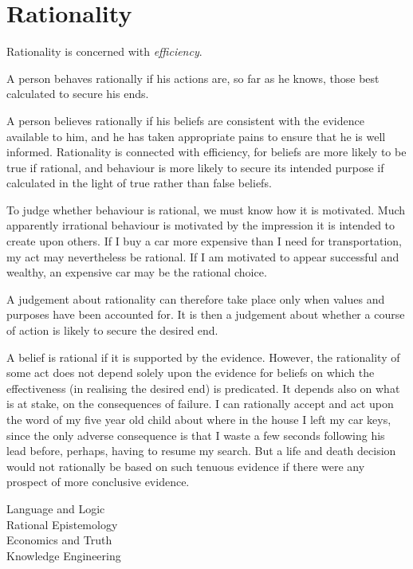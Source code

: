 \section{Rationality}

Rationality is concerned with {\it efficiency}.

A person behaves rationally if his actions are, so far as he knows, those best calculated to secure his ends.

A person believes rationally if his beliefs are consistent with the evidence available to him, and he has taken appropriate pains to ensure that he is well informed.
Rationality is connected with efficiency, for beliefs are more likely to be true if rational, and behaviour is more likely to secure its intended purpose if calculated in the light of true rather than false beliefs.

To judge whether behaviour is rational, we must know how it is motivated.
Much apparently irrational behaviour is motivated by the impression it is intended to create upon others.
If I buy a car more expensive than I need for transportation, my act may nevertheless be rational.
If I am motivated to appear successful and wealthy, an expensive car may be the rational choice.

A judgement about rationality can therefore take place only when values and purposes have been accounted for.
It is then a judgement about whether a course of action is likely to secure the desired end.

A belief is rational if it is supported by the evidence.
However, the rationality of some act does not depend solely upon the evidence for beliefs on which the effectiveness (in realising the desired end) is predicated.
It depends also on what is at stake, on the consequences of failure.
I can rationally accept and act upon the word of my five year old child about where in the house I left my car keys, since the only adverse consequence is that I waste a few seconds following his lead before, perhaps, having to resume my search.
But a life and death decision would not rationally be based on such tenuous evidence if there were any prospect of more conclusive evidence.

\begin{description}
\item[Language and Logic]
\item[Rational Epistemology]
\item[Economics and Truth]
\item[Knowledge Engineering] 
\end{description}

